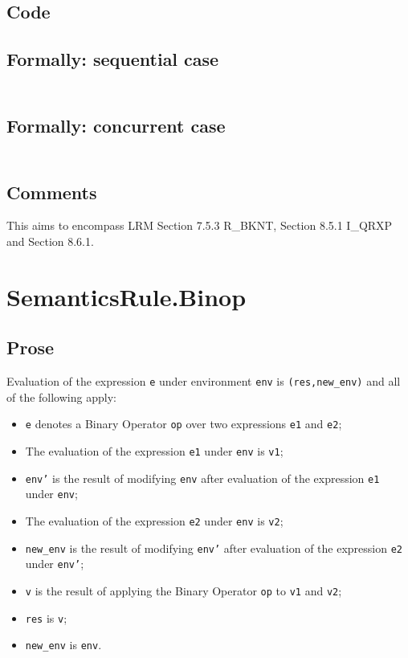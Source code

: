 \documentclass{book}
\begin{document}
  \subsection{Code}

  \subsection{Formally: sequential case}
  \begin{align}
  \end{align} 

  \subsection{Formally: concurrent case}
  \begin{align}
  \end{align} 

  \subsection{Comments}
  This aims to encompass LRM Section 7.5.3 R\_BKNT, Section 8.5.1 I\_QRXP and Section
  8.6.1.

\section{SemanticsRule.Binop \label{sec:SemanticsRule.Binop}}

  \subsection{Prose}
Evaluation of the expression \texttt{e} under environment \texttt{env} is \texttt{(res,new\_env)} and all of the following apply:
  \begin{itemize}
  \item \texttt{e} denotes a Binary Operator \texttt{op} over two expressions \texttt{e1} and \texttt{e2};
  \item The evaluation of the expression \texttt{e1} under \texttt{env} is \texttt{v1};
  \item \texttt{env'} is the result of modifying \texttt{env} after evaluation of the expression \texttt{e1} under \texttt{env};
  \item The evaluation of the expression \texttt{e2} under \texttt{env} is \texttt{v2};
  \item \texttt{new\_env} is the result of modifying \texttt{env'} after evaluation of the expression \texttt{e2} under \texttt{env'};
  \item \texttt{v} is the result of applying the Binary Operator \texttt{op} to \texttt{v1} and \texttt{v2};
  \item \texttt{res} is \texttt{v};
  \item \texttt{new\_env} is \texttt{env}.
  \end{itemize}
\end{document}
